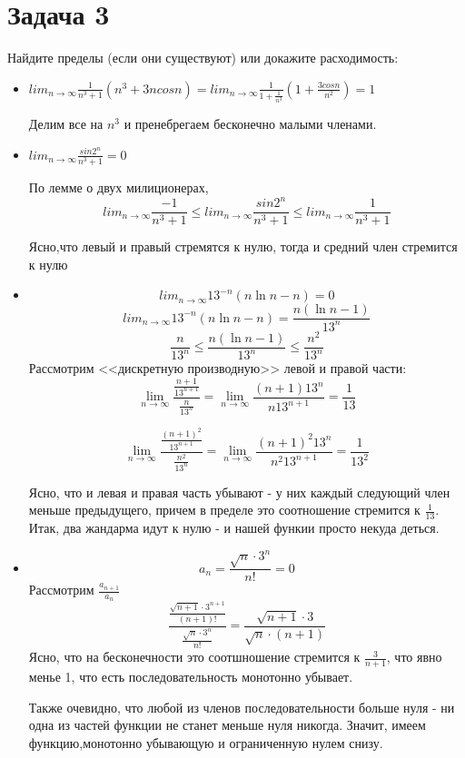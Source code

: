 \documentclass[11pt]{article}
\begin{document}
\section{Задача 3}
Найдите пределы (если они существуют) или докажите расходимость:
\begin{itemize}
\item $lim_{n \to \infty}\frac{1}{n^3+1} (n^3 + 3n cos n) =lim_{n \to \infty}\frac{1}{1+\frac{1}{n^3}} (1 + \frac{3 cos n}{n^2}) = 1 $

Делим все на $n^3$ и пренебрегаем бесконечно малыми членами.

\item $lim_{n \to \infty}\frac{sin 2^n}{n^3+1} =0$

По лемме о двух милиционерах,$$lim_{n \to \infty}\frac{-1}{n^3+1} \le lim_{n \to \infty}\frac{sin 2^n}{n^3+1}\le lim_{n \to \infty}\frac{1}{n^3+1}$$

Ясно,что левый и правый стремятся к нулю, тогда и средний член стремится к нулю

\item $$lim_{n \to \infty}13^{-n}(n \ln n - n) = 0$$
$$lim_{n \to \infty}13^{-n}(n \ln n - n) = \frac{n(\ln n -1)}{13^n}$$
$$\frac{n}{13^n}\le\frac{n(\ln n -1)}{13^n}\le\frac{n^2}{13^n}$$
Рассмотрим <<дискретную производную>> левой и правой части:
$$\lim_{n \to \infty} \frac{\frac{n+1}{13^{n+1}}}{\frac{n}{13^n}} = \lim_{n \to \infty}\frac{(n+1)13^n}{n 13^{n+1}} = \frac1{13}$$
 
$$\lim_{n \to \infty} \frac{\frac{(n+1)^2}{13^{n+1}}}{\frac{n^2}{13^n}} = \lim_{n \to \infty}\frac{(n+1)^2 13^n}{n^2 13^{n+1}} = \frac1{13^2}$$

Ясно, что и левая и правая часть убывают - у них каждый следующий член меньше предыдущего, причем в пределе это соотношение стремится к $\frac1{13}$. Итак, два жандарма идут к нулю - и нашей функии просто некуда деться.


\item $$a_n =\frac{\sqrt{n}\cdot 3^n}{n!} = 0$$
Рассмотрим $\frac{a_{n+1}}{a_n}$
$$\frac{\frac{\sqrt{n+1}\cdot 3^{n+1}}{(n+1)!}}{\frac{\sqrt{n}\cdot 3^n}{n!}} = \frac{\sqrt{n+1}\cdot 3}{\sqrt{n}\cdot(n+1)}$$
Ясно, что на бесконечности это соотшношение стремится к $\frac3{n+1}$, что явно менье 1, что есть последовательность монотонно убывает. 

Также очевидно, что любой из членов последовательности больше нуля - ни одна из частей функции не станет меньше нуля никогда. Значит, имеем функцию,монотонно убывающую и ограниченную нулем снизу. 

\end{itemize}
\end{document}
